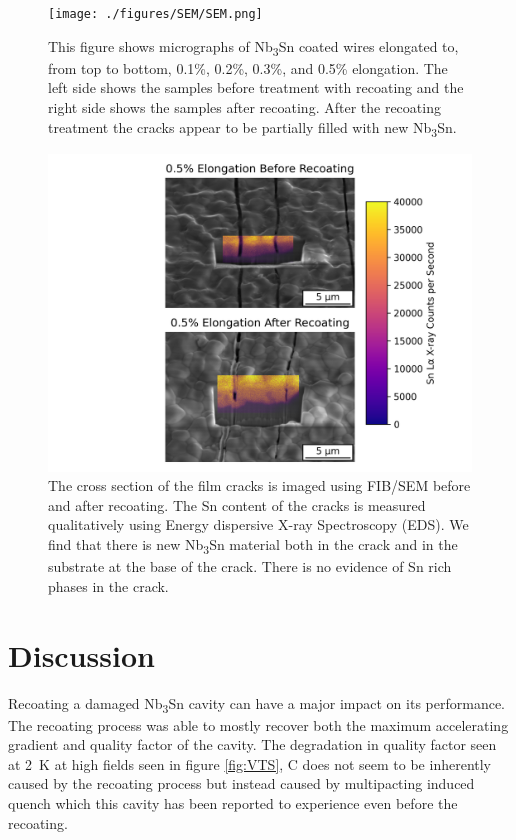 \begin{figure}
    
    \texttt{[image: ./figures/SEM/SEM.png]}
    \caption{This figure shows micrographs of Nb\textsubscript{3}Sn coated wires elongated to, from top to bottom, 0.1\%, 0.2\%, 0.3\%, and 0.5\% elongation. The left side shows the samples before treatment with recoating and the right side shows the samples after recoating. After the recoating treatment the cracks appear to be partially filled with new Nb\textsubscript{3}Sn.}
    \label{fig:SEM}
\end{figure}

\begin{figure}
    
    \includegraphics[]{./figures/EDS/EDS.png}
    \caption{The cross section of the film cracks is imaged using FIB/SEM before and after recoating. The Sn content of the cracks is measured qualitatively using Energy dispersive X-ray Spectroscopy (EDS). We find that there is new Nb\textsubscript{3}Sn material both in the crack and in the substrate at the base of the crack. There is no evidence of Sn rich phases in the crack.}
    \label{fig:EDS}
\end{figure}


\section*{Discussion}
\label{sec:Discussion}

Recoating a damaged Nb\textsubscript{3}Sn cavity can have a major impact on its performance. The recoating process was able to mostly recover both the maximum accelerating gradient and quality factor of the cavity. The degradation in quality factor seen at \qty{2}{\kelvin} at high fields seen in figure \ref{fig:VTS}, C does not seem to be inherently caused by the recoating process but instead caused by multipacting induced quench which this cavity has been reported to experience even before the recoating.


